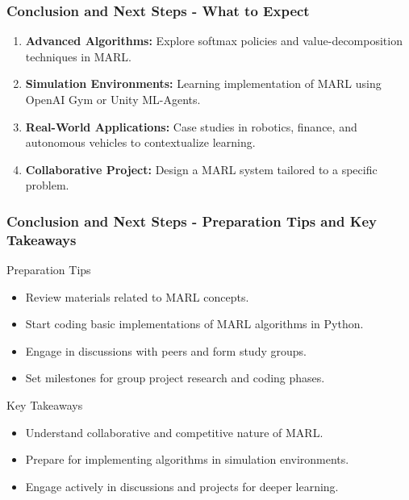 \documentclass[aspectratio=169]{beamer}
\begin{document}
\begin{frame}[fragile]
    \frametitle{Conclusion and Next Steps - What to Expect}
    \begin{enumerate}
        \item \textbf{Advanced Algorithms:} Explore softmax policies and value-decomposition techniques in MARL.
        \item \textbf{Simulation Environments:} Learning implementation of MARL using OpenAI Gym or Unity ML-Agents.
        \item \textbf{Real-World Applications:} Case studies in robotics, finance, and autonomous vehicles to contextualize learning.
        \item \textbf{Collaborative Project:} Design a MARL system tailored to a specific problem.
    \end{enumerate}
\end{frame}

\begin{frame}[fragile]
    \frametitle{Conclusion and Next Steps - Preparation Tips and Key Takeaways}
    \begin{block}{Preparation Tips}
        \begin{itemize}
            \item Review materials related to MARL concepts.
            \item Start coding basic implementations of MARL algorithms in Python.
            \item Engage in discussions with peers and form study groups.
            \item Set milestones for group project research and coding phases.
        \end{itemize}
    \end{block}
    
    \begin{block}{Key Takeaways}
        \begin{itemize}
            \item Understand collaborative and competitive nature of MARL.
            \item Prepare for implementing algorithms in simulation environments.
            \item Engage actively in discussions and projects for deeper learning.
        \end{itemize}
    \end{block}
\end{frame}
\end{document}
